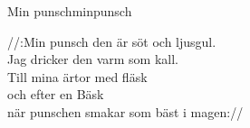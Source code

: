 \begin{song}{Min punsch}{minpunsch}
\begin{vers}
//:Min punsch den är söt och ljusgul.\\
Jag dricker den varm som kall.\\
Till mina ärtor med fläsk\\
och efter en Bäsk\\
när punschen smakar som bäst i magen://\\
\end{vers}
\end{song}
